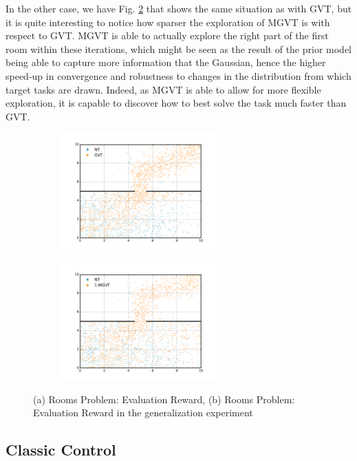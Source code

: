 \documentclass{article}
\begin{document}
In the other case, we have Fig. \ref{fig:nt-vs-mgvt} that shows the same situation as with GVT, but it is quite interesting to notice how sparser the exploration of MGVT is with respect to GVT. MGVT is able to actually explore the right part of the first room within these iterations, which might be seen as the result of the prior model being able to capture more information that the Gaussian, hence the higher speed-up in convergence and robustness to changes in the distribution from which target tasks are drawn. Indeed, as MGVT is able to allow for more flexible exploration, it is capable to discover how to best solve the task much faster than GVT.

\begin{figure}[t]
  \begin{subfigure}[b]{0.45\textwidth}
    \includegraphics[trim=0.5cm 0cm 1.8cm 1.3cm,clip=true,height=4.5cm]{images/three-room-app/nt_vs_gvt.pdf}
    \caption{}
    \label{fig:nt-vs-gvt}
  \end{subfigure}
  \begin{subfigure}[b]{0.45\textwidth}
    \includegraphics[trim=0.5cm 0cm 1.8cm 1.3cm,clip=true,height=4.5cm]{images/three-room-app/nt_vs_mgvt.pdf}
    \caption{}
    \label{fig:nt-vs-mgvt}
  \end{subfigure}
  \caption{(a) Rooms Problem: Evaluation Reward, (b) Rooms Problem: Evaluation Reward in the generalization experiment}
  \label{fig:rooms-expl}
\end{figure}

\subsection{Classic Control}
\end{document}
